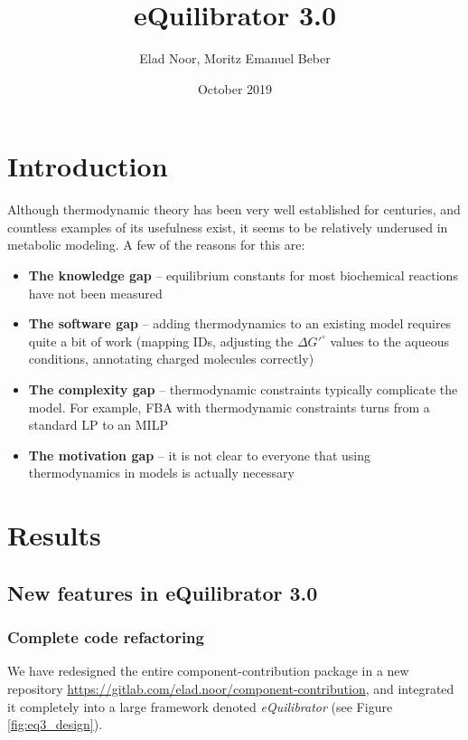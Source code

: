 \documentclass{article}
\title{eQuilibrator 3.0}
\author{Elad Noor, Moritz Emanuel Beber}
\date{October 2019}
\begin{document}
\maketitle
\tableofcontents
\section{Introduction}
Although thermodynamic theory has been very well established for centuries, and countless examples of its usefulness exist, it seems to be relatively underused in metabolic modeling. A few of the reasons for this are:
\begin{itemize}
    \item \textbf{The knowledge gap} -- equilibrium constants for most biochemical reactions have not been measured
    \item \textbf{The software gap} -- adding thermodynamics to an existing model requires quite a bit of work (mapping IDs, adjusting the $\Delta G'^\circ$ values to the aqueous conditions, annotating charged molecules correctly)
    \item \textbf{The complexity gap} -- thermodynamic constraints typically complicate the model. For example, FBA with thermodynamic constraints turns from a standard LP to an MILP
    \item \textbf{The motivation gap} -- it is not clear to everyone that using thermodynamics in models is actually necessary 
\end{itemize}

\section{Results}

\subsection{New features in eQuilibrator 3.0}

\subsubsection{Complete code refactoring}
We have redesigned the entire component-contribution package in a new repository \url{https://gitlab.com/elad.noor/component-contribution}, and integrated it completely into a large framework denoted \textit{eQuilibrator} (see Figure \ref{fig:eq3_design}).
\end{document}
